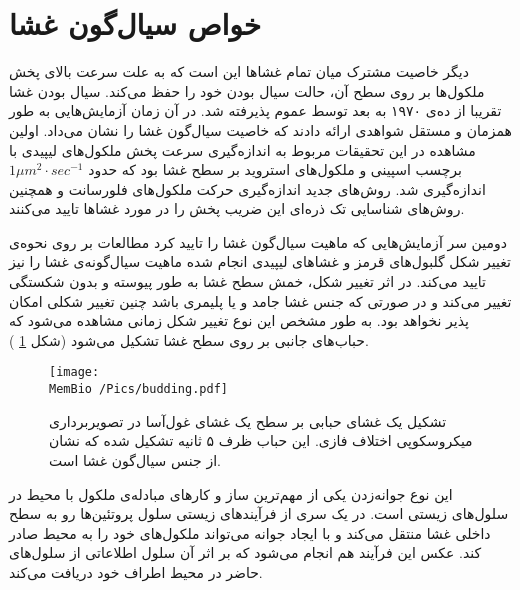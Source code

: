 \setRL
\section{
خواص سیال‌گون غشا
}

دیگر خاصیت مشترک میان تمام غشا‌ها این است که به علت سرعت بالای پخش ملکول‌ها بر روی سطح آن، حالت سیال بودن خود را حفظ می‌کند. سیال بودن غشا تقریبا از ده‌ی ۱۹۷۰ به بعد توسط عموم پذیرفته شد. در آن زمان آزمایش‌هایی به طور همزمان و مستقل شواهدی ارائه دادند که خاصیت سیال‌گون غشا را نشان می‌داد. اولین مشاهده در این تحقیقات مربوط به اندازه‌گیری سرعت پخش ملکول‌های لیپیدی  با برچسب اسپینی
\cite{Kornberg1971DiffusionPhospholipids, Devaux1972LateralDiffusion}
و ملکول‌های استروید
\cite{Sackmann1972, Traeubl1972}
بر سطح غشا بود که حدود 
$1 \mu m^2\cdot sec^{-1}$
اندازه‌گیری شد. روش‌های جدید اندازه‌گیری  حرکت ملکول‌های فلورسانت
\cite{almeida1992lateral }
و همچنین روش‌های شناسایی تک ذره‌ای 
\cite{Sako1994, Saxton1997, Fujiwara2002, Kusumi2005}
این ضریب پخش را در مورد غشاها تایید می‌کنند.

دومین سر آزمایش‌هایی که ماهیت سیال‌گون غشا را تایید کرد  مطالعات بر روی نحوه‌ی تغییر شکل گلبول‌های قرمز 
\cite{Canham1970, Evans1974}
و غشاهای لیپیدی
\cite{Helfrich1973, Helfrich1976}
انجام شده ماهیت سیال‌گونه‌ی غشا را نیز تایید می‌کند. در اثر تغییر شکل، خمش سطح غشا  به طور پیوسته و بدون شکستگی تغییر می‌کند و در صورتی که جنس غشا جامد و یا پلیمری باشد چنین تغییر شکلی امکان پذیر نخواهد بود. به طور مشخص این نوع تغییر شکل زمانی مشاهده می‌شود که حباب‌های جانبی بر روی سطح غشا تشکیل می‌شود (شکل 
\ref{fig:budding}
).

\begin{figure}[h]
\begin{center}
\texttt{[image: \\MemBio /Pics/budding.pdf]}
\caption{
تشکیل یک غشای حبابی بر سطح یک غشای غول‌آسا در تصویربرداری میکروسکوپی اختلاف فازی. این حباب ظرف ۵ ثانیه تشکیل  شده که نشان از جنس سیال‌گون غشا است.
\cite{Dimova2006} 
}
\label{fig:budding}
\end{center}
\end{figure}

این نوع جوانه‌زدن
یکی از مهم‌ترین ساز‌ و کار‌های مبادله‌ی ملکول با محیط در سلول‌های زیستی‌ است. در یک سری از فرآیند‌های زیستی سلول پروتئین‌ها رو به سطح داخلی غشا منتقل می‌کند و با ایجاد جوانه می‌تواند ملکول‌های خود را به محیط صادر کند. عکس این فرآیند هم انجام می‌شود که بر اثر آن سلول اطلاعاتی از سلول‌های حاضر در محیط اطراف خود دریافت می‌کند.






